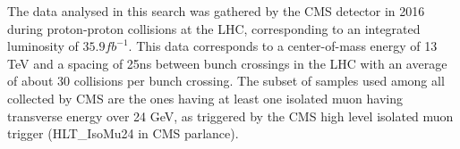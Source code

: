 The data analysed in this search was gathered by the CMS detector in 2016 during proton-proton collisions at the LHC, corresponding to an integrated luminosity of $35.9 fb^{-1}$. This data corresponds to a center-of-mass energy of 13 TeV and a spacing of 25ns between bunch crossings in the LHC with an average of about 30 collisions per bunch crossing. The subset of samples used among all collected by CMS are the ones having at least one isolated muon having transverse energy over 24 GeV, as triggered by the CMS high level isolated muon trigger (HLT\_IsoMu24 in CMS parlance).




%
% 
% 

%
% 
% 

